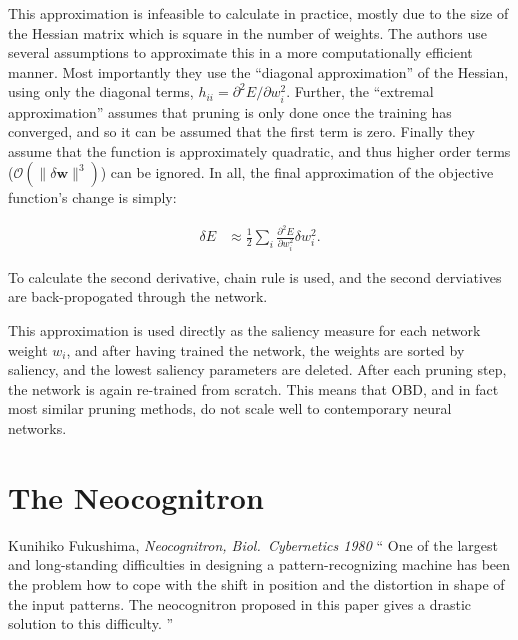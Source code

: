 \documentclass[thesis]{subfiles}
\begin{document}
       This approximation is infeasible to calculate in practice, mostly due to the size of the Hessian matrix which is square in the number of weights. The authors use several assumptions to approximate this in a more computationally efficient manner. Most importantly they use the ``diagonal approximation'' of the Hessian, using only the diagonal terms, $h_{ii}=\partial^2 E / \partial w_i^2$. Further, the ``extremal approximation'' assumes that pruning is only done once the training has converged, and so it can be assumed that the first term is zero. Finally they assume that the function is approximately quadratic, and thus higher order terms (\ie $\mathcal{O}(\|\delta \mathbf{w}\|^3)$) can be ignored. In all, the final approximation of the objective function's change is simply:
       
       \begin{align}
           \delta E &\approx \frac{1}{2} \sum_i \frac{\partial^2 E}{\partial w_i^2} \delta w_i^2.
       \end{align}
       
       To calculate the second derivative, chain rule is used, and the second derviatives are back-propogated through the network. 
       
       This approximation is used directly as the saliency measure for each network weight $w_i$, and after having trained the network, the weights are sorted by saliency, and the lowest saliency parameters are deleted. After each pruning step, the network is again re-trained from scratch. This means that OBD, and in fact most similar pruning methods, do not scale well to contemporary neural networks.
	\citet{lecun1989optimal,sietsma1988neural,Xing2009,journals/corr/HanMD15,ullrich2017soft,}
	
	
\section{The Neocognitron}
	\begin{chapquote}{Kunihiko Fukushima, \textit{Neocognitron, 
				Biol.\ Cybernetics 1980}}
		`` One of the largest and long-standing difficulties in designing a pattern-recognizing machine has been the problem how to cope with the shift in position and the distortion in shape of the input patterns. The neocognitron proposed in this paper gives a drastic solution to this difficulty.
		''
	\end{chapquote}
	
\end{document}

